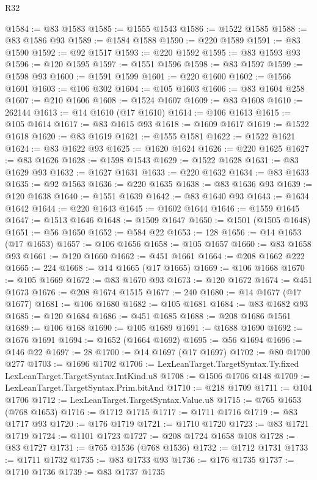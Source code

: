 \begin{lexlean}{R32}
\begin{coremodule}
@1584 := @83 @1583
@1585 := @1555 @1543
@1586 := @1522 @1585
@1588 := @83 @1586 @93
@1589 := @1584 @1588
@1590 := @220 @1589
@1591 := @83 @1590
@1592 := @92 @1517
@1593 := @220 @1592
@1595 := @83 @1593 @93
@1596 := @120 @1595
@1597 := @1551 @1596
@1598 := @83 @1597
@1599 := @1598 @93
@1600 := @1591 @1599
@1601 := @220 @1600
@1602 := @1566 @1601
@1603 := @106 @302
@1604 := @105 @1603
@1606 := @83 @1604 @258
@1607 := @210 @1606
@1608 := @1524 @1607
@1609 := @83 @1608
@1610 := 262144
@1613 := @14 @1610 (@17 @1610)
@1614 := @106 @1613
@1615 := @105 @1614
@1617 := @83 @1615 @93
@1618 := @1609 @1617
@1619 := @1522 @1618
@1620 := @83 @1619
@1621 := @1555 @1581
@1622 := @1522 @1621
@1624 := @83 @1622 @93
@1625 := @1620 @1624
@1626 := @220 @1625
@1627 := @83 @1626
@1628 := @1598 @1543
@1629 := @1522 @1628
@1631 := @83 @1629 @93
@1632 := @1627 @1631
@1633 := @220 @1632
@1634 := @83 @1633
@1635 := @92 @1563
@1636 := @220 @1635
@1638 := @83 @1636 @93
@1639 := @120 @1638
@1640 := @1551 @1639
@1642 := @83 @1640 @93
@1643 := @1634 @1642
@1644 := @220 @1643
@1645 := @1602 @1644
@1646 := @1559 @1645
@1647 := @1513 @1646
@1648 := @1509 @1647
@1650 := @1501 (@1505 @1648)
@1651 := @56 @1650
@1652 := @584 @22
@1653 := 128
@1656 := @14 @1653 (@17 @1653)
@1657 := @106 @1656
@1658 := @105 @1657
@1660 := @83 @1658 @93
@1661 := @120 @1660
@1662 := @451 @1661
@1664 := @208 @1662 @222
@1665 := 224
@1668 := @14 @1665 (@17 @1665)
@1669 := @106 @1668
@1670 := @105 @1669
@1672 := @83 @1670 @93
@1673 := @120 @1672
@1674 := @451 @1673
@1676 := @208 @1674 @1515
@1677 := 240
@1680 := @14 @1677 (@17 @1677)
@1681 := @106 @1680
@1682 := @105 @1681
@1684 := @83 @1682 @93
@1685 := @120 @1684
@1686 := @451 @1685
@1688 := @208 @1686 @1561
@1689 := @106 @168
@1690 := @105 @1689
@1691 := @1688 @1690
@1692 := @1676 @1691
@1694 := @1652 (@1664 @1692)
@1695 := @56 @1694
@1696 := @146 @22
@1697 := 28
@1700 := @14 @1697 (@17 @1697)
@1702 := @80 @1700 @277
@1703 := @1696 @1702
@1706 := LexLeanTarget.TargetSyntax.Ty.fixed LexLeanTarget.TargetSyntax.IntKind.u8
@1708 := @1506 @1706 @148
@1709 := LexLeanTarget.TargetSyntax.Prim.bitAnd
@1710 := @218 @1709
@1711 := @104 @1706
@1712 := LexLeanTarget.TargetSyntax.Value.u8
@1715 := @765 @1653 (@768 @1653)
@1716 := @1712 @1715
@1717 := @1711 @1716
@1719 := @83 @1717 @93
@1720 := @176 @1719
@1721 := @1710 @1720
@1723 := @83 @1721 @1719
@1724 := @1101 @1723
@1727 := @208 @1724 @1658 @108
@1728 := @83 @1727
@1731 := @765 @1536 (@768 @1536)
@1732 := @1712 @1731
@1733 := @1711 @1732
@1735 := @83 @1733 @93
@1736 := @176 @1735
@1737 := @1710 @1736
@1739 := @83 @1737 @1735

\end{coremodule}
\end{lexlean}
